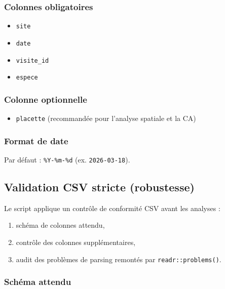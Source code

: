 \subsubsection{Colonnes obligatoires}\label{colonnes-obligatoires}

\begin{itemize}
\tightlist
\item
  \texttt{site}
\item
  \texttt{date}
\item
  \texttt{visite\_id}
\item
  \texttt{espece}
\end{itemize}

\subsubsection{Colonne optionnelle}\label{colonne-optionnelle}

\begin{itemize}
\tightlist
\item
  \texttt{placette} (recommandée pour l'analyse spatiale et la CA)
\end{itemize}

\subsubsection{Format de date}\label{format-de-date}

Par défaut : \texttt{\%Y-\%m-\%d} (ex. \texttt{2026-03-18}).

\subsection{Validation CSV stricte
(robustesse)}\label{validation-csv-stricte-robustesse}

Le script applique un contrôle de conformité CSV avant les analyses :

\begin{enumerate}
\def\labelenumi{\arabic{enumi}.}
\tightlist
\item
  schéma de colonnes attendu,
\item
  contrôle des colonnes supplémentaires,
\item
  audit des problèmes de parsing remontés par
  \texttt{readr::problems()}.
\end{enumerate}

\subsubsection{Schéma attendu}\label{schuxe9ma-attendu}

